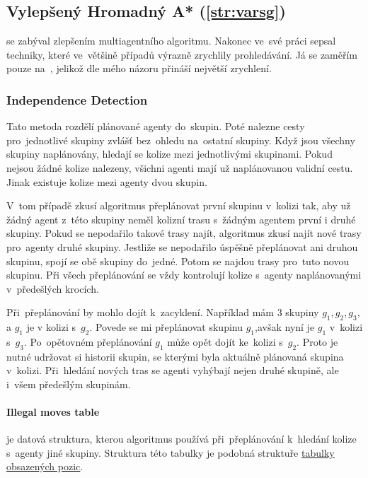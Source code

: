 \subsection{Vylepšený Hromadný A* (\ref{str:varsg})}\label{subsec:vylepseny_hromadny_a_star}

\citeauthor{Standley_2010} se zabýval zlepšením multiagentního  algoritmu.
Nakonec ve~své práci \citet*{Standley_2010} sepsal techniky, které ve~většině případů výrazně zrychlily prohledávání.
Já se zaměřím pouze na~,
jelikož dle mého názoru přináší největší zrychlení.

\subsubsection{Independence Detection}\label{subsubsec:varsg_independence_detection}

Tato metoda rozdělí plánované agenty do~skupin.
Poté nalezne cesty pro~jednotlivé skupiny zvlášť bez~ohledu na~ostatní skupiny.
Když jsou všechny skupiny naplánovány, hledají se kolize mezi jednotlivými skupinami.
Pokud nejsou žádné kolize nalezeny, všichni agenti mají už naplánovanou validní cestu.
Jinak existuje kolize mezi agenty dvou skupin.

V~tom případě zkusí algoritmus přeplánovat první skupinu v~kolizi tak,
aby už žádný agent z~této skupiny neměl kolizní trasu s~žádným agentem první i druhé skupiny.
Pokud se nepodařilo takové trasy najít, algoritmus zkusí najít nové trasy pro~agenty druhé skupiny.
Jestliže se nepodařilo úspěšně přeplánovat ani druhou skupinu, spojí se obě skupiny do~jedné.
Potom se najdou trasy pro~tuto novou skupinu.
Při všech přeplánování se vždy kontrolují kolize s~agenty naplánovanými v~předešlých krocích.

Při~přeplánování by mohlo dojít k~zacyklení.
Například mám $3$ skupiny $g_1, g_2, g_3$, a $g_1$ je v kolizi s~$g_2$.
Povede se mi přeplánovat skupinu $g_1$,avšak nyní je $g_1$ v~kolizi s~$g_3$.
Po~opětovném přeplánování $g_1$ může opět dojít ke~kolizi s~$g_2$.
Proto je nutné udržovat si historii skupin, se kterými byla aktuálně plánovaná skupina v~kolizi.
Při~hledání nových tras se agenti vyhýbají nejen druhé skupině, ale i~všem předešlým skupinám.

\paragraph{Illegal moves table}\label{par:varsg_illegal_moves_table} je datová struktura,
kterou algoritmus používá při~přeplánování k~hledání kolize s~agenty jiné skupiny.
Struktura této tabulky je podobná struktuře \hyperref[par:obsazene_pozice]{tabulky obsazených pozic}.


